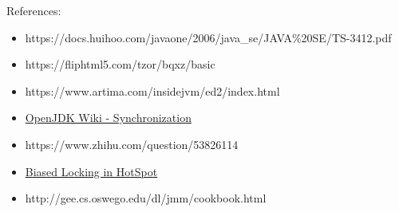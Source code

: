 \documentclass[12pt]{article}
\begin{document}
References:

\begin{itemize}
\tightlist
\item
  https://docs.huihoo.com/javaone/2006/java\_se/JAVA\%20SE/TS-3412.pdf
\item
  https://fliphtml5.com/tzor/bqxz/basic
\item
  https://www.artima.com/insidejvm/ed2/index.html
\item
  \href{https://wiki.openjdk.java.net/display/HotSpot/Synchronization}{OpenJDK Wiki - Synchronization}
\item
  https://www.zhihu.com/question/53826114
\item
  \href{https://blogs.oracle.com/dave/biased-locking-in-hotspot}{Biased Locking in HotSpot}
\item
  http://gee.cs.oswego.edu/dl/jmm/cookbook.html
\end{itemize}
\end{document}
